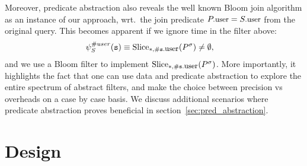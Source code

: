 Moreover, predicate abstraction also reveals the well known Bloom
join algorithm as an instance of our approach, wrt.\ the join
predicate $\facc{P}{user} = \facc{S}{user}$ from the original query. 
This becomes apparent if we ignore time in the filter above:
\begin{align*}
&
\PrecedesPPP^{\hashid{user}}(\symv{s}) \equiv 
\slice{\syms{P}}{*, \hashid{\facc{\symv{s}}{user}}}
 \neq \emptyset,
\end{align*}
and we use a Bloom filter to implement 
$\slice{\syms{P}}{*, \hashid{\facc{\symv{s}}{user}}}$.
More importantly, it highlights the fact that one can use data and predicate 
abstraction to explore the entire spectrum of abstract filters, and make the 
choice between precision vs overheads on a case by case basis.
We discuss additional scenarios where predicate abstraction proves
beneficial in section~\ref{sec:pred_abstraction}.

\section{Design}
\label{sec:design}

